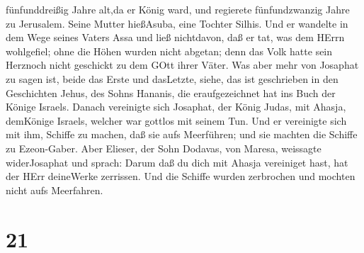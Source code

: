 fünfunddreißig Jahre alt,da er König ward, und regierete fünfundzwanzig
Jahre zu Jerusalem. Seine Mutter hießAsuba, eine Tochter Silhis.
 Und er wandelte in dem Wege seines Vaters Assa und ließ
nichtdavon, daß er tat, was dem HErrn wohlgefiel;  ohne die
Höhen wurden nicht abgetan; denn das Volk hatte sein Herznoch nicht
geschickt zu dem GOtt ihrer Väter.  Was aber mehr von
Josaphat zu sagen ist, beide das Erste und dasLetzte, siehe, das ist
geschrieben in den Geschichten Jehus, des Sohns Hananis, die
eraufgezeichnet hat ins Buch der Könige Israels.  Danach
vereinigte sich Josaphat, der König Judas, mit Ahasja, demKönige
Israels, welcher war gottlos mit seinem Tun.  Und er
vereinigte sich mit ihm, Schiffe zu machen, daß sie aufs Meerführen; und
sie machten die Schiffe zu Ezeon-Gaber.  Aber Elieser, der
Sohn Dodavas, von Maresa, weissagte widerJosaphat und sprach: Darum daß
du dich mit Ahasja vereiniget hast, hat der HErr deineWerke zerrissen.
Und die Schiffe wurden zerbrochen und mochten nicht aufs Meerfahren.

\hypertarget{section-20}{%
\section{21}\label{section-20}}

